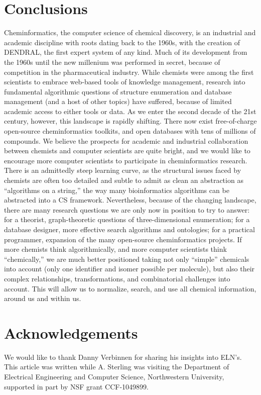\documentclass{sig-alternate}
\begin{document}
\section{Conclusions}
\label{sec:conclusions}
Cheminformatics, the computer science of chemical discovery, is an
industrial and academic discipline with roots dating back to the
1960s, with the creation of DENDRAL, the first expert system of any
kind.  Much of its development from the 1960s until the new millenium
was performed in secret, because of competition in the pharmaceutical
industry.  While chemists were among the first scientists to embrace
web-based tools of knowledge management, research into fundamental
algorithmic questions of structure enumeration and database management
(and a host of other topics) have suffered, because of limited
academic access to either tools or data.  As we enter the second
decade of the 21st century, however, this landscape is rapidly
shifting.  There now exist free-of-charge open-source cheminformatics
toolkits, and open databases with tens of millions of compounds.  We
believe the prospects for academic and industrial collaboration
between chemists and computer scientists are quite bright, and we
would like to encourage more computer scientists to participate in
cheminformatics research.  There is an admittedly steep learning
curve, as the structural issues faced by chemists are often too
detailed and subtle to admit as clean an abstraction as ``algorithms
on a string,'' the way many bioinformatics algorithms can be abstracted into a CS
framework.  Nevertheless, because of the changing landscape, there are
many research questions we are only now in position to try to answer:
for a theorist, graph-theoretic questions of three-dimensional
enumeration; for a database designer, more effective search algorithms
and ontologies; for a practical programmer, expansion of the many
open-source cheminformatics projects.  If more chemists think
algorithmically, and more computer scientists think ``chemically,''
we are much better positioned taking not only ``simple'' chemicals
into account (only one identifier and isomer possible per molecule),
but also their complex relationships, transformations, and
combinatorial challenges into account. This will allow us to
normalize, search, and use all chemical information, around us and
within us.

\section*{Acknowledgements}
We would like to thank Danny Verbinnen for sharing his insights into
ELN's.  This article was written while A. Sterling was visiting the
Department of Electrical Engineering and Computer Science,
Northwestern University, supported in part by NSF grant CCF-1049899.



\end{document}
